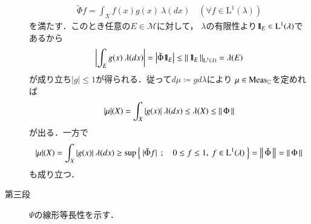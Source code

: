 \begin{prf}
\begin{description}
				\begin{align}
					\tilde{\Phi}f = \int_X f(x) g(x)\ \lambda(dx)
					\quad (\forall f \in \mathrm{L}^1(\lambda))
				\end{align}
				を満たす．このとき任意の$E \in \mathcal{M}$に対して，
				$\lambda$の有限性より$\mbox{1}\hspace{-0.25em}\mbox{l}_E \in \mathrm{L}^1(\lambda)$であるから
				\begin{align}
					\left| \int_E g(x)\ \lambda(dx) \right|
					= \left| \tilde{\Phi} \mbox{1}\hspace{-0.25em}\mbox{l}_E \right|
					\leq \left\|\, \mbox{1}\hspace{-0.25em}\mbox{l}_E\, \right\|_{\mathrm{L}^1(\lambda)}
					= \lambda(E)
				\end{align}
				が成り立ち$|g| \leq 1$が得られる．従って$d\mu \coloneqq g d\lambda$により
				$\mu \in \mathrm{Meas}_{\mathbb{C}}$を定めれば
				\begin{align}
					|\mu|(X) = \int_X |g(x)|\ \lambda(dx) \leq \lambda(X) \leq \left\|\, \Phi\, \right\|_{}
				\end{align}
				が出る．一方で
				\begin{align}
					|\mu|(X) = \int_X |g(x)|\ \lambda(dx)
					\geq \operatorname*{sup}_{} \left\{\ |\tilde{\Phi} f|\ \, ; \quad  0 \leq f \leq 1,\ f \in \mathrm{L}^1(\lambda)\ \right\} = \left\|\, \tilde{\Phi}\, \right\|_{} = \left\|\, \Phi\, \right\|_{}
				\end{align}
				も成り立つ．
				
			\item[第三段] $\Psi$の線形等長性を示す．
		\end{description}
	\end{prf}